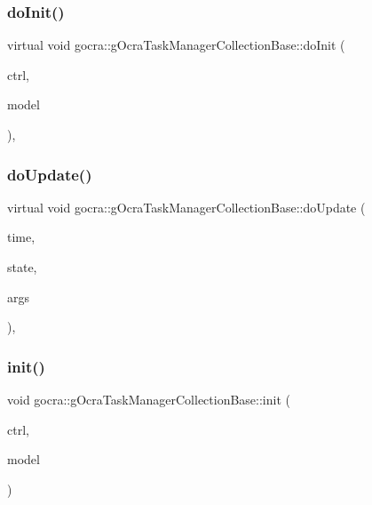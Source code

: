 \subsubsection{\texorpdfstring{do\+Init()}{doInit()}}
{\footnotesize\ttfamily virtual void gocra\+::g\+Ocra\+Task\+Manager\+Collection\+Base\+::do\+Init (\begin{DoxyParamCaption}\item[{\hyperlink{classgocra_1_1GHCJTController}{gocra\+::\+G\+H\+C\+J\+T\+Controller} \&}]{ctrl,  }\item[{ocra\+::\+Model \&}]{model }\end{DoxyParamCaption})\hspace{0.3cm}{\ttfamily [protected]}, {}}

\hypertarget{classgocra_1_1gOcraTaskManagerCollectionBase_a42f29543b66d4ff1e297225e0f5c6501}{}\label{classgocra_1_1gOcraTaskManagerCollectionBase_a42f29543b66d4ff1e297225e0f5c6501} 
\subsubsection{\texorpdfstring{do\+Update()}{doUpdate()}}
{\footnotesize\ttfamily virtual void gocra\+::g\+Ocra\+Task\+Manager\+Collection\+Base\+::do\+Update (\begin{DoxyParamCaption}\item[{double}]{time,  }\item[{ocra\+::\+Model \&}]{state,  }\item[{void $\ast$$\ast$}]{args }\end{DoxyParamCaption})\hspace{0.3cm}{\ttfamily [protected]}, {}}

\hypertarget{classgocra_1_1gOcraTaskManagerCollectionBase_ae962f18a286bc706ee867eede15822b6}{}\label{classgocra_1_1gOcraTaskManagerCollectionBase_ae962f18a286bc706ee867eede15822b6} 
\subsubsection{\texorpdfstring{init()}{init()}}
{\footnotesize\ttfamily void gocra\+::g\+Ocra\+Task\+Manager\+Collection\+Base\+::init (\begin{DoxyParamCaption}\item[{\hyperlink{classgocra_1_1GHCJTController}{gocra\+::\+G\+H\+C\+J\+T\+Controller} \&}]{ctrl,  }\item[{ocra\+::\+Model \&}]{model }\end{DoxyParamCaption})}



